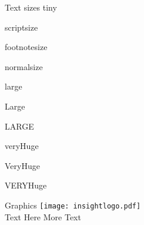 \documentclass[final,hyperref={pdfpagelabels=false}]{beamer}
\begin{document}
\begin{frame}{}
\begin{columns}[T]
\begin{column}{.43\paperwidth}
\begin{block}{Text sizes}
\centering
	{\tiny tiny}\par
	{\scriptsize scriptsize}\par
	{\footnotesize footnotesize}\par
	{\normalsize normalsize}\par
	{\large large}\par
	{\Large Large}\par
	{\LARGE LARGE}\par
	{\veryHuge veryHuge}\par
	{\VeryHuge VeryHuge}\par
	{\VERYHuge VERYHuge}\par
\end{block}

\begin{block}{Graphics}
\texttt{[image: insightlogo.pdf]} \\
Text Here \blindtext
{}
More Text \blindtext
\end{block}

\end{column}
\end{columns}



\end{frame}
\end{document}
